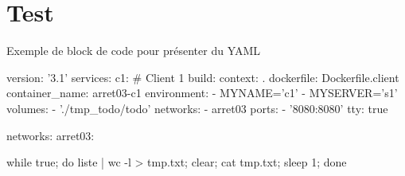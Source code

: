 \documentclass[a11paper, 11pt]{article}
\begin{document}
\section{Test}

Exemple de block de code pour présenter du YAML

\begin{code}[listing options={language=YAML},
  title=\verb!docker-compose.yml!
]
version: '3.1'
services:
  c1: # Client 1
    build:
      context: .
      dockerfile: Dockerfile.client
    container_name: arret03-c1
    environment:
      - MYNAME='c1'
      - MYSERVER='s1'
    volumes:
      - './tmp_todo/todo'
    networks:
      - arret03
    ports:
      - '8080:8080'
    tty: true

networks:
  arret03:
\end{code}

\begin{code}[listing options={style=bashstyle},
  title=\verb!docker-compose.yml!
]
while true; do
  liste | wc -l > tmp.txt;
  clear;
  cat tmp.txt;
  sleep 1;
done
\end{code}
\end{document}
